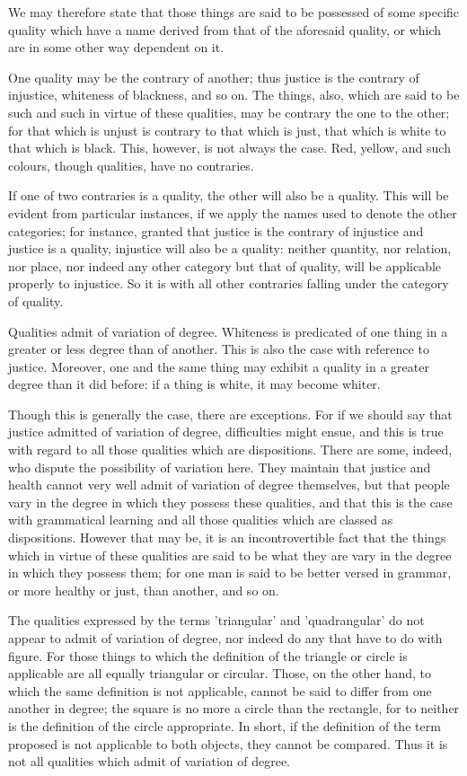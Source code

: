 We may therefore state that those things are said to be possessed of
some specific quality which have a name derived from that of the
aforesaid quality, or which are in some other way dependent on it.

One quality may be the contrary of another; thus justice is the
contrary of injustice, whiteness of blackness, and so on. The things,
also, which are said to be such and such in virtue of these qualities,
may be contrary the one to the other; for that which is unjust is
contrary to that which is just, that which is white to that which is
black. This, however, is not always the case. Red, yellow, and such
colours, though qualities, have no contraries.

If one of two contraries is a quality, the other will also be a
quality. This will be evident from particular instances, if we apply
the names used to denote the other categories; for instance, granted
that justice is the contrary of injustice and justice is a quality,
injustice will also be a quality: neither quantity, nor relation, nor
place, nor indeed any other category but that of quality, will be
applicable properly to injustice. So it is with all other contraries
falling under the category of quality.

Qualities admit of variation of degree. Whiteness is predicated of one
thing in a greater or less degree than of another. This is also the
case with reference to justice. Moreover, one and the same thing may
exhibit a quality in a greater degree than it did before: if a thing is
white, it may become whiter.

Though this is generally the case, there are exceptions. For if we
should say that justice admitted of variation of degree, difficulties
might ensue, and this is true with regard to all those qualities which
are dispositions. There are some, indeed, who dispute the possibility
of variation here. They maintain that justice and health cannot very
well admit of variation of degree themselves, but that people vary in
the degree in which they possess these qualities, and that this is the
case with grammatical learning and all those qualities which are
classed as dispositions. However that may be, it is an incontrovertible
fact that the things which in virtue of these qualities are said to be
what they are vary in the degree in which they possess them; for one
man is said to be better versed in grammar, or more healthy or just,
than another, and so on.

The qualities expressed by the terms 'triangular' and 'quadrangular' do
not appear to admit of variation of degree, nor indeed do any that have
to do with figure. For those things to which the definition of the
triangle or circle is applicable are all equally triangular or
circular. Those, on the other hand, to which the same definition is not
applicable, cannot be said to differ from one another in degree; the
square is no more a circle than the rectangle, for to neither is the
definition of the circle appropriate. In short, if the definition of
the term proposed is not applicable to both objects, they cannot be
compared. Thus it is not all qualities which admit of variation of
degree.

